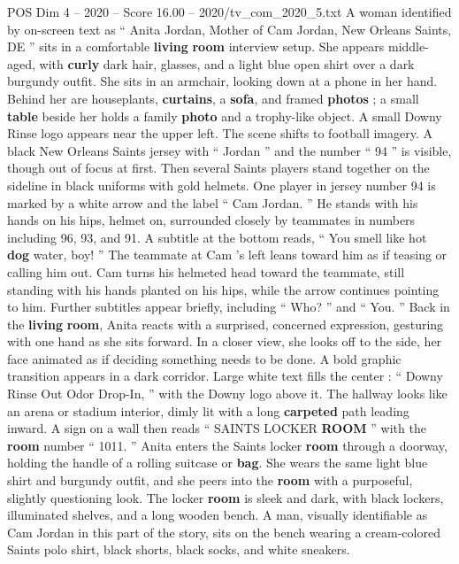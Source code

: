 \begin{textsample}{POS Dim 4 – 2020 – Score 16.00 – 2020/tv\_com\_2020\_5.txt}  \label{ex:f4_pos_013}
A woman identified by on-screen text as “ Anita Jordan, Mother of Cam Jordan, New Orleans Saints, DE ” sits in a comfortable \textbf{living} \textbf{room} interview setup.
She appears middle-aged, with \textbf{curly} dark hair, glasses, and a light blue open shirt over a dark burgundy outfit.
She sits in an armchair, looking down at a phone in her hand.
Behind her are houseplants, \textbf{curtains}, a \textbf{sofa}, and framed \textbf{photos} ; a small \textbf{table} beside her holds a family \textbf{photo} and a trophy-like object.
A small Downy Rinse logo appears near the upper left.
The scene shifts to football imagery.
A black New Orleans Saints jersey with “ Jordan ” and the number “ 94 ” is visible, though out of focus at first.
Then several Saints players stand together on the sideline in black uniforms with gold helmets.
One player in jersey number 94 is marked by a white arrow and the label “ Cam Jordan. ” He stands with his hands on his hips, helmet on, surrounded closely by teammates in numbers including 96, 93, and 91.
A subtitle at the bottom reads, “ You smell like hot \textbf{dog} water, boy! ” The teammate at Cam ’s left leans toward him as if teasing or calling him out.
Cam turns his helmeted head toward the teammate, still standing with his hands planted on his hips, while the arrow continues pointing to him.
Further subtitles appear briefly, including “ Who? ” and “ You. ” Back in the \textbf{living} \textbf{room}, Anita reacts with a surprised, concerned expression, gesturing with one hand as she sits forward.
In a closer view, she looks off to the side, her face animated as if deciding something needs to be done.
A bold graphic transition appears in a dark corridor.
Large white text fills the center : “ Downy Rinse Out Odor Drop-In, ” with the Downy logo above it.
The hallway looks like an arena or stadium interior, dimly lit with a long \textbf{carpeted} path leading inward.
A sign on a wall then reads “ SAINTS LOCKER \textbf{ROOM} ” with the \textbf{room} number “ 1011. ” Anita enters the Saints locker \textbf{room} through a doorway, holding the handle of a rolling suitcase or \textbf{bag}.
She wears the same light blue shirt and burgundy outfit, and she peers into the \textbf{room} with a purposeful, slightly questioning look.
The locker \textbf{room} is sleek and dark, with black lockers, illuminated shelves, and a long wooden bench.
A man, visually identifiable as Cam Jordan in this part of the story, sits on the bench wearing a cream-colored Saints polo shirt, black shorts, black socks, and white sneakers.

\end{textsample}
